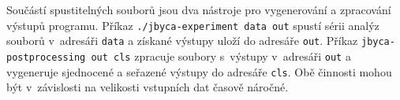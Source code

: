 Součástí spustitelných souborů jsou dva nástroje pro vygenerování a zpracování výstupů programu. Příkaz \texttt{./jbyca-experiment data out} spustí sérii analýz souborů v~adresáři \texttt{data} a získané výstupy uloží do adresáře \texttt{out}. Příkaz \texttt{jbyca-postprocessing out cls} zpracuje soubory s~výstupy v~adresáři \texttt{out} a vygeneruje sjednocené a seřazené výstupy do adresáře \texttt{cls}. Obě činnosti mohou být v~závislosti na velikosti vstupních dat časově náročné.







